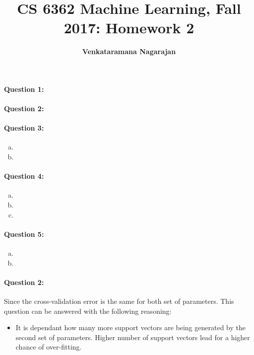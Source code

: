 \documentclass[letterpaper,11pt]{article}
\title{CS 6362 Machine Learning, Fall 2017: Homework 2}
\date{}
\author{\bf Venkataramana Nagarajan}
\begin{document}
\maketitle

\paragraph{Question 1:}

\paragraph{Question 2:}


\paragraph{Question 3:}
\begin{enumerate}[(a)]
\item

\item
\end{enumerate}

\paragraph{Question 4:}
\begin{enumerate}[(a)]
\item

\item

\item

\end{enumerate}

\paragraph{Question 5:}
\begin{enumerate}[(a)]
\item

\item
	
\end{enumerate}

\paragraph{Question 2:}

Since the cross-validation error is the same for both set of parameters. This question can be answered with the following reasoning:
\begin{itemize}
	\item It is dependant how many more support vectors are being generated by the second set of parameters. Higher number of support vectors lead for a higher chance of over-fitting.
\end{itemize}
\end{document}
